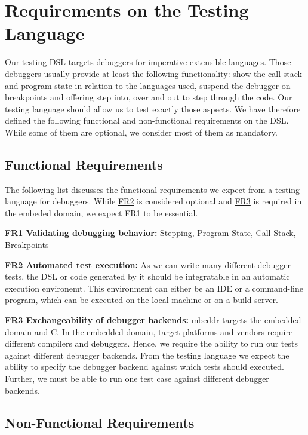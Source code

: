 \section{Requirements on the Testing Language}

Our testing \ac{DSL} targets debuggers for imperative extensible languages.
Those debuggers usually provide at least the following functionality:
show the call stack and program state in relation to the languages used, 
suspend the debugger on breakpoints and offering step into, over and out to step
through the code. Our testing language should allow us to test exactly those
aspects. We have therefore defined the following functional and non-functional
requirements on the \ac{DSL}. While some of them are optional, we consider most
of them as mandatory.

\subsection{Functional Requirements}

The following list discusses the functional requirements we expect from a
testing language for debuggers. While \hyperref[FR2]{FR2} is considered
optional and \hyperref[FR3]{FR3} is required in the embeded domain, we expect
\hyperref[FR1]{FR1} to be essential.

\noindent \textbf{\label{FR1}FR1 Validating debugging behavior:} Stepping,
Program State, Call Stack, 	Breakpoints

\noindent \textbf{\label{FR2}FR2 Automated test execution:} As we can write many
different debugger tests, the \ac{DSL} or code generated by it should be
integratable in an automatic execution environemt. This environment can either
be an \ac{IDE} or a command-line program, which can be executed on the local
machine or on a build server.


\noindent \textbf{\label{FR3}FR3 Exchangeability of debugger backends:}
mbeddr targets the embedded domain and C. In the embedded domain, target platforms and
vendors require different compilers and debuggers. 
Hence, we require the ability to run our tests against
different debugger backends. From the testing language we expect the ability to
specify the debugger backend against which tests should executed. Further, we
must be able to run one test case against different debugger backends.

\subsection{Non-Functional Requirements}

